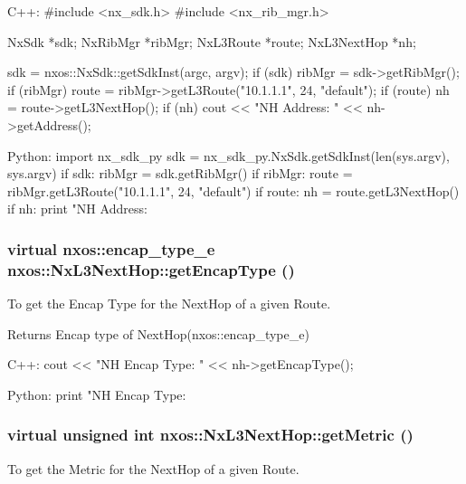 \begin{DoxyCode}
  C++:
       #include <nx_sdk.h>
       #include <nx_rib_mgr.h>

       NxSdk        *sdk;
       NxRibMgr     *ribMgr;
       NxL3Route    *route;
       NxL3NextHop  *nh;

       sdk = nxos::NxSdk::getSdkInst(argc, argv);
       if (sdk) {
           ribMgr = sdk->getRibMgr();
           if (ribMgr) {
               route = ribMgr->getL3Route("10.1.1.1", 24, "default");
               if (route) {
                   nh = route->getL3NextHop();
                   if (nh) cout << "NH Address: " << nh->getAddress();
               }
           }
       }

  Python:
       import nx_sdk_py
       sdk = nx_sdk_py.NxSdk.getSdkInst(len(sys.argv), sys.argv)
       if sdk:
          ribMgr = sdk.getRibMgr()
          if ribMgr:
             route = ribMgr.getL3Route("10.1.1.1", 24, "default")
             if route:
                nh = route.getL3NextHop()
                if nh:
                   print "NH Address: %
\end{DoxyCode}
 \hypertarget{classnxos_1_1NxL3NextHop_ab873695bc97ea1085013056e4989a297}{
\subsubsection[{getEncapType}]{\setlength{\rightskip}{0pt plus 5cm}virtual nxos::encap\_\-type\_\-e nxos::NxL3NextHop::getEncapType ()}}
\label{classnxos_1_1NxL3NextHop_ab873695bc97ea1085013056e4989a297}
To get the Encap Type for the NextHop of a given Route.

\begin{DoxyReturn}{Returns}
Encap type of NextHop(nxos::encap\_\-type\_\-e)
\end{DoxyReturn}

\begin{DoxyCode}
  C++:
       cout << "NH Encap Type: " << nh->getEncapType();

  Python:
       print "NH Encap Type: %
\end{DoxyCode}
 \hypertarget{classnxos_1_1NxL3NextHop_a3d72a5a7b99b292b11248b25daef63c0}{
\subsubsection[{getMetric}]{\setlength{\rightskip}{0pt plus 5cm}virtual unsigned int nxos::NxL3NextHop::getMetric ()}}
\label{classnxos_1_1NxL3NextHop_a3d72a5a7b99b292b11248b25daef63c0}
To get the Metric for the NextHop of a given Route.

